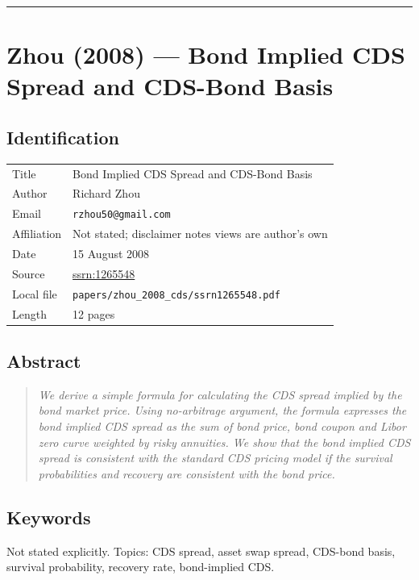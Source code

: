 \documentclass[11pt,a4paper]{article}
\begin{document}
\bigskip\hrule\bigskip

\section{Zhou (2008) --- Bond Implied CDS Spread and CDS-Bond Basis}
\label{bib:zhou-2008-cds}

\subsection*{Identification}
\begin{tabular}{@{}p{3.5cm}p{11cm}@{}}
\toprule
Title           & Bond Implied CDS Spread and CDS-Bond Basis \\
Author          & Richard Zhou \\
Email           & \texttt{rzhou50@gmail.com} \\
Affiliation     & Not stated; disclaimer notes views are author's own \\
Date            & 15 August 2008 \\
Source          & \href{https://ssrn.com/abstract=1265548}{ssrn:1265548} \\
Local file      & \texttt{papers/zhou\_2008\_cds/ssrn1265548.pdf} \\
Length          & 12 pages \\
\bottomrule
\end{tabular}

\subsection*{Abstract}
\begin{quote}\itshape
We derive a simple formula for calculating the CDS spread implied by
the bond market price. Using no-arbitrage argument, the formula
expresses the bond implied CDS spread as the sum of bond price, bond
coupon and Libor zero curve weighted by risky annuities. We show that
the bond implied CDS spread is consistent with the standard CDS
pricing model if the survival probabilities and recovery are
consistent with the bond price.
\end{quote}

\subsection*{Keywords}
Not stated explicitly. Topics: CDS spread, asset swap spread, CDS-bond basis, survival probability, recovery rate, bond-implied CDS.
\end{document}
